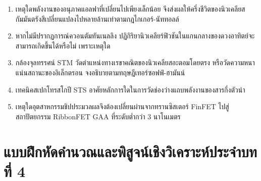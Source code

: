 \begin{enumerate}
    \item เหตุใดพลังงานของอนุภาคแอลฟาที่เปลี่ยนไปเพียงเล็กน้อย จึงส่งผลให้ครึ่งชีวิตของนิวเคลียสกัมมันตรังสีเปลี่ยนแปลงไปหลายล้านเท่าตามกฎไกเกอร์-นัททอลล์
    \item หากไม่มีปรากฏการณ์ควอนตัมทันเนลลิง ปฏิกิริยานิวเคลียร์ฟิวชันในแกนกลางของดวงอาทิตย์จะสามารถเกิดขึ้นได้หรือไม่ เพราะเหตุใด
    \item กล้องจุลทรรศน์ STM วัดตำแหน่งทางเรขาคณิตของนิวเคลียสอะตอมโดยตรง หรือวัดความหนาแน่นสถานะของอิเล็กตรอน จงอธิบายตามทฤษฎีเทอร์ซอฟฟ์-ฮามันน์
    \item เทคนิคสเปกโทรสโกปี STS อาศัยหลักการใดในการวัดช่องว่างแถบพลังงานของสารกึ่งตัวนำ
    \item เหตุใดอุตสาหกรรมชิปประมวลผลจึงต้องเปลี่ยนผ่านจากทรานซิสเตอร์ FinFET ไปสู่สถาปัตยกรรม RibbonFET GAA ที่ระดับต่ำกว่า 3 นาโนเมตร
\end{enumerate}

\section{แบบฝึกหัดคำนวณและพิสูจน์เชิงวิเคราะห์ประจำบทที่ 4}
\label{sec_analytical_problems_ch04}

